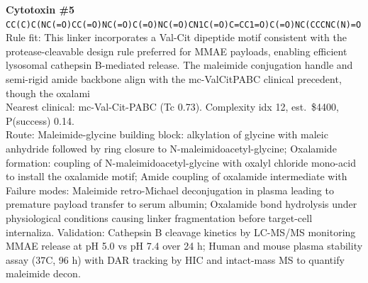 \documentclass[10pt]{article}
\begin{document}
\noindent\textbf{Cytotoxin \#5} \\ \texttt{CC(C)C(NC(=O)CC(=O)NC(=O)C(=O)NC(=O)CN1C(=O)C=CC1=O)C(=O)NC(CCCNC(N)=O} \\ Rule fit: This linker incorporates a Val-Cit dipeptide motif consistent with the protease-cleavable design rule preferred for MMAE payloads, enabling efficient lysosomal cathepsin B-mediated release. The maleimide conjugation handle and semi-rigid amide backbone align with the mc-ValCitPABC clinical precedent, though the oxalami \\ Nearest clinical: mc-Val-Cit-PABC (Tc 0.73). Complexity idx 12, est.\ \$4400, P(success) 0.14. \\ Route: Maleimide-glycine building block: alkylation of glycine with maleic anhydride followed by ring closure to N-maleimidoacetyl-glycine; Oxalamide formation: coupling of N-maleimidoacetyl-glycine with oxalyl chloride mono-acid to install the oxalamide motif; Amide coupling of oxalamide intermediate with \\ Failure modes: Maleimide retro-Michael deconjugation in plasma leading to premature payload transfer to serum albumin; Oxalamide bond hydrolysis under physiological conditions causing linker fragmentation before target-cell internaliza. Validation: Cathepsin B cleavage kinetics by LC-MS/MS monitoring MMAE release at pH 5.0 vs pH 7.4 over 24 h; Human and mouse plasma stability assay (37\textdegree{}C, 96 h) with DAR tracking by HIC and intact-mass MS to quantify maleimide decon. \\[0.4em]
\end{document}
